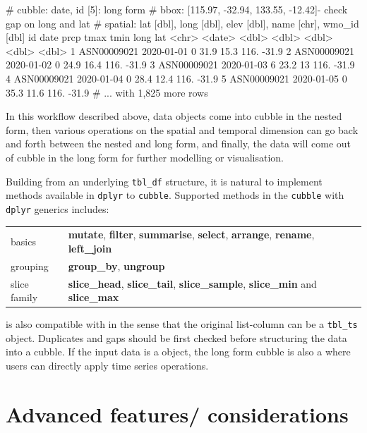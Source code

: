 \documentclass[
]{jss}
\begin{document}
\begin{CodeChunk}
\begin{CodeOutput}
# cubble:  date, id [5]: long form
# bbox:    [115.97, -32.94, 133.55, -12.42]- check gap on long and lat
# spatial: lat [dbl], long [dbl], elev [dbl], name [chr], wmo_id [dbl]
  id          date        prcp  tmax  tmin  long   lat
  <chr>       <date>     <dbl> <dbl> <dbl> <dbl> <dbl>
1 ASN00009021 2020-01-01     0  31.9  15.3  116. -31.9
2 ASN00009021 2020-01-02     0  24.9  16.4  116. -31.9
3 ASN00009021 2020-01-03     6  23.2  13    116. -31.9
4 ASN00009021 2020-01-04     0  28.4  12.4  116. -31.9
5 ASN00009021 2020-01-05     0  35.3  11.6  116. -31.9
# ... with 1,825 more rows
\end{CodeOutput}
\end{CodeChunk}

In this workflow described above, data objects come into cubble in the
nested form, then various operations on the spatial and temporal
dimension can go back and forth between the nested and long form, and
finally, the data will come out of cubble in the long form for further
modelling or visualisation.

Building from an underlying \texttt{tbl\_df} structure, it is natural to
implement methods available in \texttt{dplyr} to \texttt{cubble}.
Supported methods in the \texttt{cubble} with \texttt{dplyr} generics
includes:

\begin{center}
\begin{tabular}{ | m{5em} | m{15cm}| } 
basics & \textbf{mutate}, \textbf{filter}, \textbf{summarise}, \textbf{select}, \textbf{arrange}, \textbf{rename}, \textbf{left\_join} \\
grouping &  \textbf{group\_by}, \textbf{ungroup}\\
slice family & \textbf{slice\_head}, \textbf{slice\_tail}, \textbf{slice\_sample}, \textbf{slice\_min} and \textbf{slice\_max} \\
\end{tabular}
\end{center}

 is also compatible with  in the sense that the
original list-column can be a \texttt{tbl\_ts} object. Duplicates and
gaps should be first checked before structuring the data into a cubble.
If the input data is a  object, the long form cubble is
also a  where users can directly apply time series
operations.

\hypertarget{advanced-features-considerations}{%
\section{Advanced features/
considerations}\label{advanced-features-considerations}}
\end{document}
